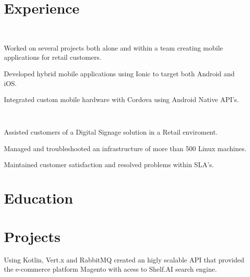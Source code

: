\documentclass[]{hieudo-build}
\begin{document}
\hfill
\begin{minipage}[t]{0.7\textwidth} 

\section{Experience}

\\
\vspace{0.9em} %
\begin{tightemize}
\item Worked on several projects both alone and within a team creating mobile applications for retail customers.
\item Developed hybrid mobile applications using Ionic to target both Android and iOS.
\item Integrated custom mobile hardware with Cordova using Android Native API's.
\end{tightemize}
\sectionsep

 \\
\begin{tightemize}
\item Assisted customers of a Digital Signage solution in a Retail enviroment.
\item Managed and troubleshooted an infrastructure of more than 500 Linux machines.
\item Maintained customer satisfaction and resolved problems within SLA's.
\end{tightemize}
\sectionsep

\section{Education} 
\descript{}
\sectionsep

\descript{}
\sectionsep

\section{Projects}

\descript{}
Using Kotlin, Vert.x and RabbitMQ created an higly scalable API that provided the e-commerce platform Magento with acess to Shelf.AI search engine.
\sectionsep 

\end{minipage} 

\centering
\vspace{4cm}
\footnotesize
{}
\end{document}
